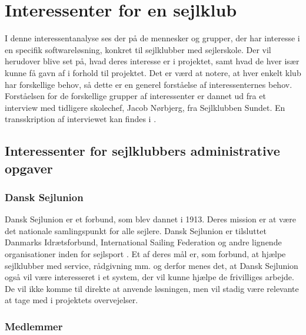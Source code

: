 \chapter{Interessenter for en sejlklub}\label{chap:interessent-analyse-ved-sejlklubber}

I denne interessentanalyse ses der på de mennesker og grupper, der har interesse i en specifik softwareløsning, konkret til sejlklubber med sejlerskole.
Der vil herudover blive set på, hvad deres interesse er i projektet, samt hvad de hver især kunne få gavn af i forhold til projektet.
Det er værd at notere, at hver enkelt klub har forskellige behov, så dette er en generel forståelse af interessenternes behov.
Forståelsen for de forskellige grupper af interessenter er dannet ud fra et interview med tidligere skolechef, Jacob Nørbjerg, fra Sejlklubben Sundet. En transskription af interviewet kan findes i . 


\section{Interessenter for sejlklubbers administrative opgaver}

\subsection{Dansk Sejlunion}

Dansk Sejlunion er et forbund, som blev dannet i 1913. Deres mission er at være det nationale samlingspunkt for alle sejlere. 
Dansk Sejlunion er tilsluttet Danmarks Idrætsforbund, International Sailing Federation og andre lignende organisationer inden for sejlsport \citep{Sejlsportdk}.
Et af deres mål er, som forbund, at hjælpe sejlklubber med service, rådgivning mm. og derfor menes det, at Dansk Sejlunion også vil være interesseret i et system, der vil kunne hjælpe de frivilliges arbejde. 
De vil ikke komme til direkte at anvende løsningen, men vil stadig være relevante at tage med i projektets overvejelser. 


\subsection{Medlemmer}\label{subsec:interessent-medlemmer}

